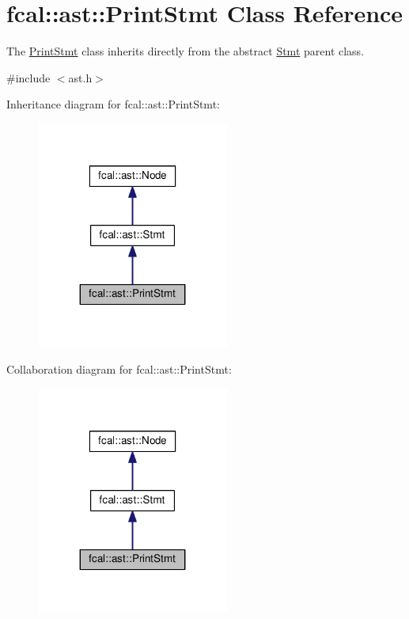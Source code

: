 \hypertarget{classfcal_1_1ast_1_1PrintStmt}{}\section{fcal\+:\+:ast\+:\+:Print\+Stmt Class Reference}
\label{classfcal_1_1ast_1_1PrintStmt}


The \hyperlink{classfcal_1_1ast_1_1PrintStmt}{Print\+Stmt} class inherits directly from the abstract \hyperlink{classfcal_1_1ast_1_1Stmt}{Stmt} parent class.  




{\ttfamily \#include $<$ast.\+h$>$}



Inheritance diagram for fcal\+:\+:ast\+:\+:Print\+Stmt\+:
\nopagebreak
\begin{figure}[H]
\begin{center}
\leavevmode
\includegraphics[width=179pt]{classfcal_1_1ast_1_1PrintStmt__inherit__graph}
\end{center}
\end{figure}


Collaboration diagram for fcal\+:\+:ast\+:\+:Print\+Stmt\+:
\nopagebreak
\begin{figure}[H]
\begin{center}
\leavevmode
\includegraphics[width=179pt]{classfcal_1_1ast_1_1PrintStmt__coll__graph}
\end{center}
\end{figure}
